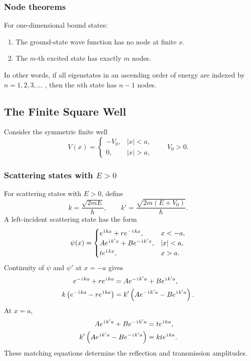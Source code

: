 \subsubsection{Node theorems}
For one-dimensional bound states:
\begin{enumerate}[label=\arabic*.]
 \item The ground-state wave function has no node at finite $x$.
 \item The $m$-th excited state has exactly $m$ nodes.
\end{enumerate}
In other words, if all eigenstates in an ascending order of energy are indexed by $n=1,2,3,\ldots$ , then the
$n$th state has $n-1$ nodes.

\subsection{The Finite Square Well}


Consider the symmetric finite well
\begin{equation}
 V(x)=
 \begin{cases}
 -V_0, & |x|<a,\\
 0, & |x|>a,
 \end{cases}
 \qquad V_0>0.
\end{equation}

\subsubsection{Scattering states with $E>0$}

For scattering states with $E>0$, define
\begin{equation}
 k=\frac{\sqrt{2mE}}{\hbar},
 \qquad
 k'=\frac{\sqrt{2m(E+V_0)}}{\hbar}.
\end{equation}
A left-incident scattering state has the form
\begin{equation}
 \psi(x)=
 \begin{cases}
 e^{\hspace{1pt}\mathrm{i}\hspace{1pt} kx}+r e^{-\hspace{1pt}\mathrm{i}\hspace{1pt} kx}, & x<-a,\\
 A e^{\hspace{1pt}\mathrm{i}\hspace{1pt} k'x}+B e^{-\hspace{1pt}\mathrm{i}\hspace{1pt} k'x}, & |x|<a,\\
 t e^{\hspace{1pt}\mathrm{i}\hspace{1pt} kx}, & x>a.
 \end{cases}
\end{equation}
Continuity of $\psi$ and $\psi'$ at $x=-a$ gives
\begin{align}
 e^{-\hspace{1pt}\mathrm{i}\hspace{1pt} ka}+r e^{\hspace{1pt}\mathrm{i}\hspace{1pt} ka}
 &=A e^{-\hspace{1pt}\mathrm{i}\hspace{1pt} k'a}+B e^{\hspace{1pt}\mathrm{i}\hspace{1pt} k'a},\\
 k\left(e^{-\hspace{1pt}\mathrm{i}\hspace{1pt} ka}-r e^{\hspace{1pt}\mathrm{i}\hspace{1pt} ka}\right)
 &=k'\left(A e^{-\hspace{1pt}\mathrm{i}\hspace{1pt} k'a}-B e^{\hspace{1pt}\mathrm{i}\hspace{1pt} k'a}\right).
\end{align}
At $x=a$,
\begin{align}
 A e^{\hspace{1pt}\mathrm{i}\hspace{1pt} k'a}+B e^{-\hspace{1pt}\mathrm{i}\hspace{1pt} k'a}&=t e^{\hspace{1pt}\mathrm{i}\hspace{1pt} ka},\\
 k'\left(A e^{\hspace{1pt}\mathrm{i}\hspace{1pt} k'a}-B e^{-\hspace{1pt}\mathrm{i}\hspace{1pt} k'a}\right)&=kt e^{\hspace{1pt}\mathrm{i}\hspace{1pt} ka}.
\end{align}
These matching equations determine the reflection and transmission
amplitudes.

